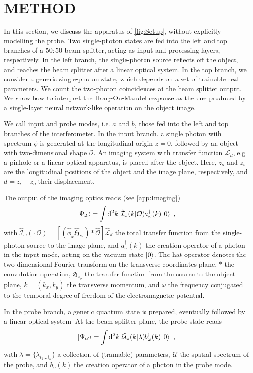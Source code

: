 \documentclass[reprint,
superscriptaddress,
nofootinbib,
aps,
pra,
showkeys
]{revtex4-2}
\newcommand*\dif{\mathop{}\!\mathrm{d}}
\newcommand{\I}{\mathcal{I}}
\newcommand{\U}{\mathcal{U}}
\renewcommand{\O}{\mathcal{O}}
\begin{document}
\section{METHOD\label{sec:SecII}}
In this section, we discuss the apparatus of \cref{fig:Setup}, without explicitly modelling the probe. Two single-photon states are fed into the left and top branches of a $50\!:\!50$ beam splitter, acting as input and processing layers, respectively. In the left branch, the single-photon source reflects off the object, and reaches the beam splitter after a linear optical system. In the top branch, we consider a generic single-photon state, which depends on a set of trainable real parameters. We count the two-photon coincidences at the beam splitter output. We show how to interpret the Hong-Ou-Mandel response as the one produced by a single-layer neural network-like operation on the object image.

We call input and probe modes, i.e. $a$ and $b$, those fed into the left and top branches of the interferometer. In the input branch, a single photon with spectrum $\phi$ is generated at the longitudinal origin $z=0$, followed by an object with two-dimensional shape $\O$. An imaging system with transfer function $\mathcal{L}_d$, e.g a pinhole or a linear optical apparatus, is placed after the object. Here, $z_o$ and $z_i$ are the longitudinal positions of the object and the image plane, respectively, and $d = z_i - z_o$ their displacement.

The output of the imaging optics reads (see \cref{app:Imaging})
\begin{equation}
    \ket{\Psi_\I} = \int \dif^2k \ \hat{\I}_\omega(k | \O) a^\dagger_\omega(k) \ket{0} \ ,
    \label{eq:PsiO}
\end{equation}
with $\hat{\I}_\omega(\cdot|\O) = [(\hat{\phi}_\omega \hat{\mathfrak{H}}_{z_o})*\hat{\O}] \hat{\mathcal{L}}_{d}$ the total transfer function from the single-photon source to the image plane, and $a^\dagger_\omega(k)$ the creation operator of a photon in the input mode, acting on the vacuum state $\ket{0}$. The hat operator denotes the two-dimensional Fourier transform on the transverse coordinates plane, $*$ the convolution operation, $\mathfrak{H}_{z_o}$ the transfer function from the source to the object plane, $k = (k_x, k_y)$ the transverse momentum, and $\omega$ the frequency conjugated to the temporal degree of freedom of the electromagnetic potential.

In the probe branch, a generic quantum state is prepared, eventually followed by a linear optical system. At the beam splitter plane, the probe state reads
\begin{equation}
    \ket{\Psi_\U} = \int \dif^2k \ \hat{\U}_\omega(k|\lambda) b_\omega^\dagger(k) \ket{0} \ ,
    \label{eq:PsiProbe}
\end{equation}
with $\lambda = \{\lambda_{i_1 \ldots i_n}\}$ a collection of (trainable) parameters, $\U$ the spatial spectrum of the probe, and $b^\dagger_\omega(k)$ the creation operator of a photon in the probe mode.
\end{document}
